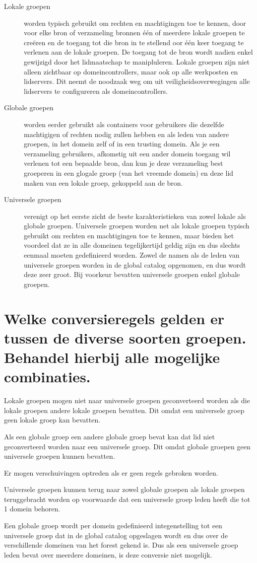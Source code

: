 \begin{description}
	\item[Lokale groepen] worden typisch gebruikt om rechten en machtigingen
		toe te kennen, door voor elke bron of verzameling bronnen één of
		meerdere lokale groepen te creëren en de toegang tot die bron in
		te stellend oor één keer toegang te verlenen aan de lokale
		groepen. De toegang tot de bron wordt nadien enkel gewijzigd
		door het lidmaatschap te manipluleren. Lokale groepen zijn niet
		alleen zichtbaar op domeincontrollers, maar ook op alle
		werkposten en lidservers. Dit neemt de noodzaak weg om uit
		veiligheidsoverwegingen alle lidservers te configureren als
		domeincontrollers.
	\item[Globale groepen] worden eerder gebruikt als containers voor
		gebruikers die dezelfde machtigigen of rechten nodig zullen
		hebben en als leden van andere groepen, in het domein zelf of in
		een trusting domein. Als je een verzameling gebruikers,
		afkomstig uit een ander domein toegang wil verlenen tot een
		bepaalde bron, dan kun je deze verzameling best groeperen in een
		glogale groep (van het vreemde domein) en deze lid maken van een
		lokale groep, gekoppeld aan de bron.
	\item[Universele groepen] verenigt op het eerste zicht de beste
		karakteristieken van zowel lokale als globale groepen.
		Universele groepen worden net als lokale groepen typisch
		gebruikt om rechten en machtigingen toe te kennen, maar bieden
		het voordeel dat ze in alle domeinen tegelijkertijd geldig zijn
		en dus slechts eenmaal moeten gedefinieerd worden. Zowel de
		namen als de leden van universele groepen worden in de global
		catalog opgenomen, en dus wordt deze zeer groot. Bij voorkeur
		bevatten universele groepen enkel globale groepen.
\end{description}

\section{Welke conversieregels gelden er tussen de diverse soorten groepen.
Behandel hierbij alle mogelijke combinaties.}

Lokale groepen mogen niet naar universele groepen geconverteerd worden als die
lokale groepen andere lokale groepen bevatten. Dit omdat een universele groep
geen lokale groep kan bevatten.

Als een globale groep een andere globale groep bevat kan dat lid niet
geconverteerd worden naar een universele groep. Dit omdat globale groepen geen
universele groepen kunnen bevatten.

Er mogen verschuivingen optreden als er geen regels gebroken worden.

Universele groepen kunnen terug naar zowel globale groepen als lokale groepen
teruggebracht worden op voorwaarde dat een universele groep leden heeft die tot
1 domein behoren.

Een globale groep wordt per domein gedefinieerd integenstelling tot een
universele groep dat in de global catalog opgeslagen wordt en dus over de
verschillende domeinen van het forest gekend is. Dus als een universele groep
leden bevat over meerdere domeinen, is deze conversie niet mogelijk.
